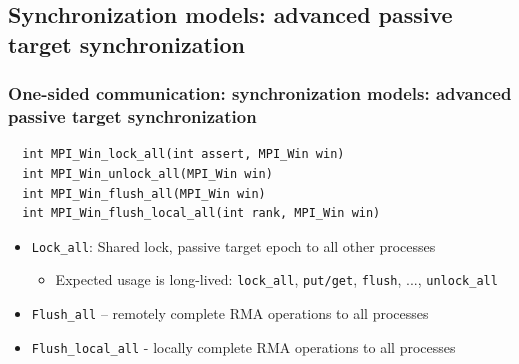 \documentclass{beamer}
\begin{document}
\subsection{Synchronization models: advanced passive target synchronization}
\begin{frame}[fragile]
  \frametitle{One-sided communication: synchronization models: advanced passive target synchronization}
{\color{mycolorcode}
\begin{verbatim}
  int MPI_Win_lock_all(int assert, MPI_Win win)
  int MPI_Win_unlock_all(MPI_Win win)
  int MPI_Win_flush_all(MPI_Win win)
  int MPI_Win_flush_local_all(int rank, MPI_Win win)
\end{verbatim}
}
  \begin{itemize}
  \item {\color{mycolorcode}\verb|Lock_all|}: Shared lock, passive target epoch to all other processes
    \begin{itemize}
      \item Expected usage is long-lived: {\color{mycolorcode}\verb|lock_all|}, {\color{mycolorcode}\verb|put/get|}, {\color{mycolorcode}\verb|flush|}, ..., {\color{mycolorcode}\verb|unlock_all|}
    \end{itemize}
    \item {\color{mycolorcode}\verb|Flush_all|} – remotely complete RMA operations to all processes
    \item {\color{mycolorcode}\verb|Flush_local_all|} - locally complete RMA operations to all processes
  \end{itemize}
\end{frame}
    
\end{document}
